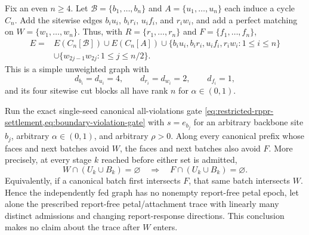 \begin{proposition}
\label{prop:double-cycle-feed-report-obstruction}
Fix an even $n\geq4$.  Let
$\mathcal B=\{b_1,\ldots,b_n\}$ and
$A=\{u_1,\ldots,u_n\}$ each induce a cycle $C_n$.  Add the sitewise edges
$b_iu_i$, $b_ir_i$, $u_if_i$, and $r_iw_i$, and add a perfect matching on
$W=\{w_1,\ldots,w_n\}$.  Thus, with
$R=\{r_1,\ldots,r_n\}$ and $F=\{f_1,\ldots,f_n\}$,
\begin{equation}
 \begin{split}
 E={}&E(C_n[\mathcal B])\cup E(C_n[A])
      \cup\{b_iu_i,b_ir_i,u_if_i,r_iw_i:1\leq i\leq n\}\\
    &\cup\{w_{2j-1}w_{2j}:1\leq j\leq n/2\}.
 \end{split}
 \label{eq:double-cycle-feed-edges}
\end{equation}
This is a simple unweighted graph with
\begin{equation*}
 d_{b_i}=d_{u_i}=4,\qquad d_{r_i}=d_{w_i}=2,
 \qquad d_{f_i}=1,
\end{equation*}
and its four sitewise cut blocks all have rank $n$ for
$\alpha\in(0,1)$.

Run the exact single-seed canonical all-violations gate
\cref{eq:restricted-rppr-settlement,eq:boundary-violation-gate} with
$s=e_{b_j}$ for an arbitrary backbone site $b_j$, arbitrary
$\alpha\in(0,1)$, and arbitrary $\rho>0$.  Along every canonical prefix whose
faces and next batches avoid $W$, the faces and next batches also avoid $F$.
More precisely, at every stage $k$ reached before either set is admitted,
\begin{equation}
 W\cap(U_k\cup B_k)=\varnothing
 \quad\Longrightarrow\quad
 F\cap(U_k\cup B_k)=\varnothing.
 \label{eq:double-cycle-feed-report-first}
\end{equation}
Equivalently, if a canonical batch first intersects $F$, that same batch
intersects $W$.  Hence the independently fed graph has no nonempty
report-free petal epoch, let alone the prescribed report-free petal/attachment
trace with linearly many distinct admissions and changing report-response
directions.  This conclusion makes no claim about the trace after $W$ enters.
\end{proposition}

